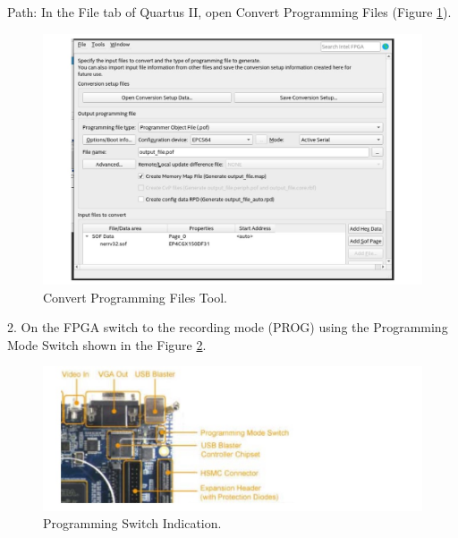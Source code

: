         Path: In the File tab of Quartus II, open Convert Programming Files (Figure \ref{f1}).
        
            \begin{figure}[!ht]
                \begin{center}
                
                    \includegraphics[width= 1\textwidth]{figures/chap2/fpga1.jpg}
                    \caption{\label{f1} Convert Programming Files Tool.}
                \end{center}
            \end{figure}
            
        2. On the FPGA switch to the recording mode (PROG) using the Programming Mode Switch shown in the Figure \ref{f2}.
        
            \begin{figure}[!ht]
                \begin{center}
                    \includegraphics[width= 1\textwidth]{figures/chap2/fpga2.jpg}
                    \caption{\label{f2} Programming Switch Indication.}
                \end{center}
            \end{figure}
        
